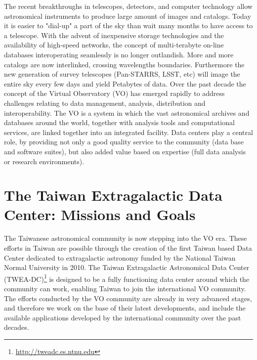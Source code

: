 The recent breakthroughs in telescopes, detectors, and computer technology allow astronomical instruments to produce large amount of images and catalogs. Today it is easier to "dial-up" a part of the sky than wait many months to have access to a telescope. With the advent of inexpensive storage technologies and the availability of high-speed networks, the concept of multi-terabyte on-line databases interoperating seamlessly is no longer outlandish. More and more catalogs are now interlinked, crossing wavelengths boundaries. Furthermore the new generation of survey telescopes (Pan-STARRS, LSST, etc) will image the entire sky every few days and yield Petabytes of data. Over the past decade the concept of the Virtual Observatory (VO) has emerged rapidly to address challenges relating to data management, analysis, distribution and interoperability. The VO is a system in which the vast astronomical archives and databases around the world, together with analysis tools and computational services, are linked together into an integrated facility. Data centers play a central role, by providing not only a good quality service to the community (data base and software suites), but also added value based on expertise (full data analysis or research environments).

\section{The Taiwan Extragalactic Data Center: Missions and Goals}

The Taiwanese astronomical community is now stepping into the VO era. These efforts in Taiwan are possible through the creation of the first Taiwan based Data Center dedicated to extragalactic astronomy funded by the National Taiwan Normal University in 2010. The Taiwan Extragalactic Astronomical Data Center (TWEA-DC)\footnote{ \url{http://tweadc.es.ntnu.edu}} is designed to be a fully functioning data center around which the community can work, enabling Taiwan to join the international VO community. The efforts conducted by the VO community are already in very advanced stages, and therefore we work on the base of their latest developments, and include the available applications developed by the international community over the past decades. \\


